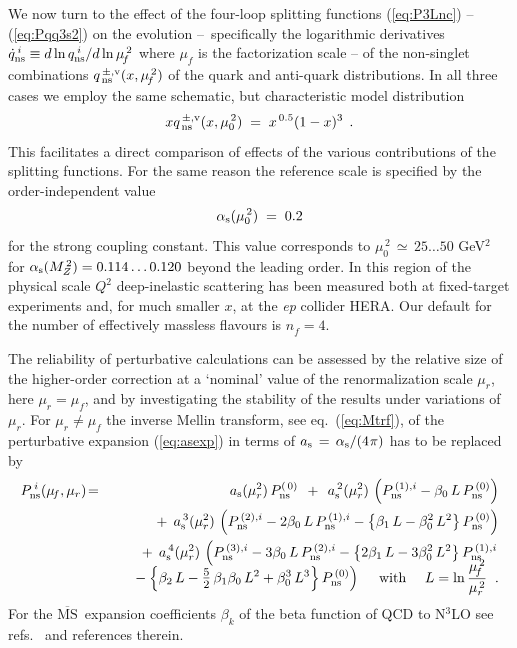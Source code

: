 \documentclass[12pt]{article}
\newcommand{\beq}{\begin{equation}}
\newcommand{\eeq}{\end{equation}}
\newcommand{\bea}{\begin{eqnarray}}
\newcommand{\eea}{\end{eqnarray}}
\newcommand{\nn}{\nonumber}
\newcommand{\MSb}{$\overline{\mbox{MS}}$}
\newcommand{\als}{\alpha_{\rm s}}
\newcommand{\ars}{a_{\rm s}}
\newcommand{\hspp}{{\hspace{5mm}}}
\def\frct#1#2{\mbox{\large{$\frac{#1}{#2}$}}}
\def\ar(#1){{a_{\rm s}^{\,#1}}}
\def\nf{{n^{}_{\! f}}}
\begin{document}
We now turn to the effect of the four-loop splitting functions 
(\ref{eq:P3Lnc}) -- (\ref{eq:Pqq3s2}) on the evolution 
--~specifically the logarithmic derivatives 
  $\dot{q}_{\rm ns}^{\: i} \equiv d \ln q_{\rm ns}^{\: i}/ d\ln \mu_{\!f}^{\,2}$ 
where $\mu_{\!f}^{}$ is the factorization scale --
of the non-singlet combinations $q_{\,\rm ns}^{\,\pm, \rm v}(x,\mu_{\!f}^{\,2})$ 
of the quark and anti-quark distributions.
%
In all three cases we employ the same schematic, but characteristic model 
distribution
%
\beq
\label{eq:shape}
  xq_{\,\rm ns}^{\,\pm,\rm v}(x,\mu_{0}^{\,2}) \; = \;
  x^{\, 0.5} (1-x)^3 \:\: .
\eeq
%
This facilitates a direct comparison of effects of the various contributions
of the splitting functions. 
For the same reason the reference scale is specified by the order-independent 
value 
%
\beq
\label{eq:asref}
  \als (\mu_{0}^{\,2}) \; = \; 0.2
\eeq
%
for the strong coupling constant.
This value corresponds to $\mu_{0}^{\,2} \,\simeq\, 25\ldots 50$ GeV$^2$ for 
$\als (M_Z^{\, 2}) = 0.114 \ldots 0.120$ beyond the leading order. 
In this region of the physical scale $Q^2$ deep-inelastic scattering has been 
measured both at fixed-target experiments and, for much smaller $x$, at the 
{\it ep} collider HERA. 
Our default for the number of effectively massless flavours is $\nf =4$.

\newpage

The reliability of perturbative calculations can be assessed by the relative
size of the higher-order correction at a `nominal' value of the 
renormalization scale $\mu_r$, here $\mu_r = \mu_{\!f}$, and by investigating the 
stability of the results under variations of $\mu_r$. For $\mu_r \neq \mu_{\!f}$
the inverse Mellin transform, see eq.~(\ref{eq:Mtrf}), of the perturbative
expansion (\ref{eq:asexp}) in terms of $\ars \,=\, \als/(4\:\!\pi)$ has to be 
replaced by
%
\bea
  P_{\rm ns}^{\: i}(\mu_{\!f},\mu_r)
  &\! =\! & \quad
      \ars(\mu_r^2) \, P_{\rm ns}^{(\,0)}  \:\: + \:\:
      \ar(2)(\mu_r^2) \, \left( 
        P_{\rm ns}^{\,(1),i} 
      - \beta_0 \, L \, P_{\rm ns}^{\,(0)} 
      \right) 
\nn \\ & & \mbox{}\!\!\!
    + \: \ar(3)(\mu_r^2) \, \left( 
        P_{\rm ns}^{\,(2),i}
      - 2\beta_0 \, L \, P_{\rm ns}^{\,(1),i}
      - \left\{ \beta_1 \,L  - \beta_0^2 \,L^2 \right\} P_{\rm ns}^{\,(0)} 
      \right)
\nn \\  & & \mbox{}\!\!\!
    + \: \ar(4)(\mu_r^2) \, \left( 
         P_{\rm ns}^{\,(3),i} 
      - 3\beta_0 \, L \, P_{\rm ns}^{\,(2),i}
      - \left\{ 2\beta_1 \,L  - 3\beta_0^2 \,L^2 \right\} 
         P_{\rm ns}^{\,(1),i}
\right. \nn \\[-3mm]  & & \left. \mbox{\hspp}
       - \left\{ \beta_2 \,L - \frct{5}{2}\, \beta_1 \beta_0 \, L^2 
           + \beta_0^3 \, L^3 \right\} P_{\rm ns}^{\,(0)}
      \right)
      \quad \mbox{ with } \quad L = \ln \frac{\mu_{\!f}^{\,2}}{\mu_r^{\,2}}
\;\; .
\eea
For the \MSb\ expansion coefficients $\beta_k$ of the beta function of QCD to 
N$^3$LO see refs.~\cite{vanRitbergen:1997va,Czakon:2004bu} and references 
therein. 
\end{document}
